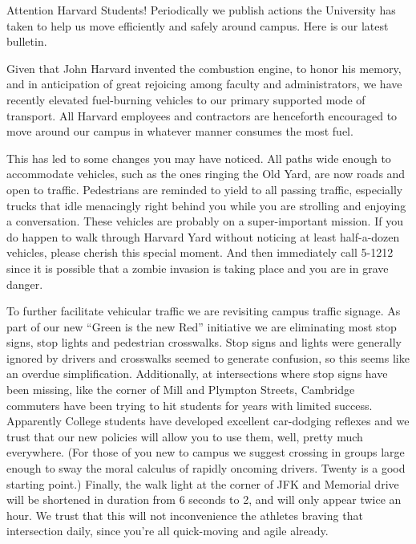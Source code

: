
Attention Harvard Students! Periodically we publish actions the University
has taken to help us move efficiently and safely around campus. Here is our
latest bulletin.

Given that John Harvard invented the combustion engine, to honor his memory,
and in anticipation of great rejoicing among faculty and administrators, we
have recently elevated fuel-burning vehicles to our primary supported mode of
transport. All Harvard employees and contractors are henceforth encouraged to
move around our campus in whatever manner consumes the most fuel.

This has led to some changes you may have noticed. All paths wide enough to
accommodate vehicles, such as the ones ringing the Old Yard, are now roads
and open to traffic. Pedestrians are reminded to yield to all passing
traffic, especially trucks that idle menacingly right behind you while you
are strolling and enjoying a conversation. These vehicles are probably on a
super-important mission. If you do happen to walk through Harvard Yard
without noticing at least half-a-dozen vehicles, please cherish this special
moment. And then immediately call 5-1212 since it is possible that a zombie
invasion is taking place and you are in grave danger.

To further facilitate vehicular traffic we are revisiting campus traffic
signage. As part of our new ``Green is the new Red'' initiative we are
eliminating most stop signs, stop lights and pedestrian crosswalks. Stop
signs and lights were generally ignored by drivers and crosswalks seemed to
generate confusion, so this seems like an overdue simplification.
Additionally, at intersections where stop signs have been missing, like the
corner of Mill and Plympton Streets, Cambridge commuters have been trying to
hit students for years with limited success. Apparently College students have
developed excellent car-dodging reflexes and we trust that our new policies
will allow you to use them, well, pretty much everywhere. (For those of you
new to campus we suggest crossing in groups large enough to sway the moral
calculus of rapidly oncoming drivers. Twenty is a good starting point.)
Finally, the walk light at the corner of JFK and Memorial drive will be
shortened in duration from 6 seconds to 2, and will only appear twice an
hour. We trust that this will not inconvenience the athletes braving that
intersection daily, since you're all quick-moving and agile already.

